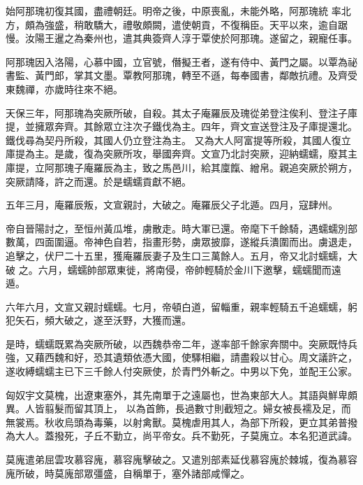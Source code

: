 \begin{pinyinscope}
 始阿那瑰初復其國，盡禮朝廷。明帝之後，中原喪亂，未能外略，阿那瑰統
 率北方，頗為強盛，稍敢驕大，禮敬頗闕，遣使朝貢，不復稱臣。天平以來，逾自踞慢。汝陽王暹之為秦州也，遣其典簽齊人淳于覃使於阿那瑰。遂留之，親寵任事。



 阿那瑰因入洛陽，心慕中國，立官號，僭擬王者，遂有侍中、黃門之屬。以覃為祕書監、黃門郎，掌其文墨。覃教阿那瑰，轉至不遜，每奉國書，鄰敵抗禮。及齊受東魏禪，亦歲時往來不絕。



 天保三年，阿那瑰為突厥所破，自殺。其太子庵羅辰及瑰從弟登注俟利、登注子庫提，並擁眾奔齊。其餘眾立注次子鐵伐為主。四年，齊文宣送登注及子庫提還北。鐵伐尋為契丹所殺，其國人仍立登注為主。
 又為大人阿富提等所殺，其國人復立庫提為主。是歲，復為突厥所攻，舉國奔齊。文宣乃北討突厥，迎納蠕蠕，廢其主庫提，立阿那瑰子庵羅辰為主，致之馬邑川，給其廩餼、繒帛。親追突厥於朔方，突厥請降，許之而還。於是蠕蠕貢獻不絕。



 五年三月，庵羅辰叛，文宣親討，大破之。庵羅辰父子北遁。四月，寇肆州。



 帝自晉陽討之，至恒州黃瓜堆，虜散走。時大軍已還。帝麾下千餘騎，遇蠕蠕別部數萬，四面圍逼。帝神色自若，指畫形勢，虜眾披靡，遂縱兵潰圍而出。虜退走，追擊之，伏尸二十五里，獲庵羅辰妻子及生口三萬餘人。五月，帝又北討蠕蠕，大破
 之。六月，蠕蠕帥部眾東徙，將南侵，帝帥輕騎於金川下邀擊，蠕蠕聞而遠遁。



 六年六月，文宣又親討蠕蠕。七月，帝頓白道，留輜重，親率輕騎五千追蠕蠕，躬犯矢石，頻大破之，遂至沃野，大獲而還。



 是時，蠕蠕既累為突厥所破，以西魏恭帝二年，遂率部千餘家奔關中。突厥既恃兵強，又藉西魏和好，恐其遺類依憑大國，使驛相繼，請盡殺以甘心。周文議許之，遂收縛蠕蠕主已下三千餘人付突厥使，於青門外斬之。中男以下免，並配王公家。



 匈奴宇文莫槐，出遼東塞外，其先南單于之遠屬也，世為東部大人。其語與鮮卑頗異。人皆翦髮而留其頂上，
 以為首飾，長過數寸則截短之。婦女被長襦及足，而無裳焉。秋收烏頭為毒藥，以射禽獸。莫槐虐用其人，為部下所殺，更立其弟普撥為大人。蓋撥死，子丘不勤立，尚平帝女。兵不勤死，子莫廆立。本名犯道武諱。



 莫廆遣弟屈雲攻慕容廆，慕容廆擊破之。又遣別部素延伐慕容廆於棘城，復為慕容廆所破，時莫廆部眾彊盛，自稱單于，塞外諸部咸憚之。




\end{pinyinscope}
